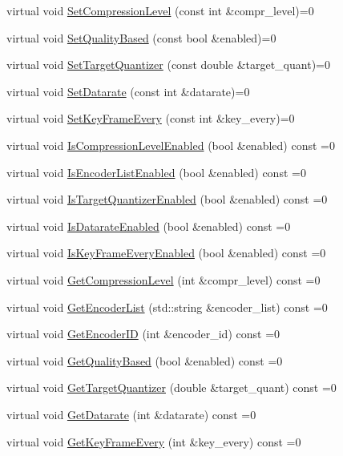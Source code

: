 \begin{DoxyCompactItemize}
\item 
virtual void \hyperlink{classsvl_video_codec_base_ab99462517e534e67543afffb9a480d48}{Set\-Compression\-Level} (const int \&compr\-\_\-level)=0
\item 
virtual void \hyperlink{classsvl_video_codec_base_a5f5d5e0cecb6ccc0476881ad7670c0c1}{Set\-Quality\-Based} (const bool \&enabled)=0
\item 
virtual void \hyperlink{classsvl_video_codec_base_a2dac9b04bd4419461cd38daa8b79a3f8}{Set\-Target\-Quantizer} (const double \&target\-\_\-quant)=0
\item 
virtual void \hyperlink{classsvl_video_codec_base_a3d9f11e00f6cbf4c52c48a78eee46447}{Set\-Datarate} (const int \&datarate)=0
\item 
virtual void \hyperlink{classsvl_video_codec_base_af04b2bd0d9f2b50347594721ee5a422b}{Set\-Key\-Frame\-Every} (const int \&key\-\_\-every)=0
\item 
virtual void \hyperlink{classsvl_video_codec_base_a93fb132b4fa598b9a7d3907b9efc2c73}{Is\-Compression\-Level\-Enabled} (bool \&enabled) const =0
\item 
virtual void \hyperlink{classsvl_video_codec_base_a771977764177e399e89b14f56415da6f}{Is\-Encoder\-List\-Enabled} (bool \&enabled) const =0
\item 
virtual void \hyperlink{classsvl_video_codec_base_a36919a662a2287bbc2855d0c0240a606}{Is\-Target\-Quantizer\-Enabled} (bool \&enabled) const =0
\item 
virtual void \hyperlink{classsvl_video_codec_base_a53d56c6b38a7341e83569de442ade7ad}{Is\-Datarate\-Enabled} (bool \&enabled) const =0
\item 
virtual void \hyperlink{classsvl_video_codec_base_a5c0479c4e6d0bc413b7a0a55ec85caa9}{Is\-Key\-Frame\-Every\-Enabled} (bool \&enabled) const =0
\item 
virtual void \hyperlink{classsvl_video_codec_base_ad4c5251087b9025915eb8de426a6f485}{Get\-Compression\-Level} (int \&compr\-\_\-level) const =0
\item 
virtual void \hyperlink{classsvl_video_codec_base_a359299dd727f4db9efebfa3b4ef95ca4}{Get\-Encoder\-List} (std\-::string \&encoder\-\_\-list) const =0
\item 
virtual void \hyperlink{classsvl_video_codec_base_aa7ce7adc80d611e6ee578d29fd0d4f3f}{Get\-Encoder\-I\-D} (int \&encoder\-\_\-id) const =0
\item 
virtual void \hyperlink{classsvl_video_codec_base_a7b6e98c1f2c0a19fd985de9ee2e28467}{Get\-Quality\-Based} (bool \&enabled) const =0
\item 
virtual void \hyperlink{classsvl_video_codec_base_a7707749fdc3d035b8e203f971694940e}{Get\-Target\-Quantizer} (double \&target\-\_\-quant) const =0
\item 
virtual void \hyperlink{classsvl_video_codec_base_a1034d3bb8ea93ac797a1539e79e5a0b7}{Get\-Datarate} (int \&datarate) const =0
\item 
virtual void \hyperlink{classsvl_video_codec_base_adfe0dd7da14804c042fc5b080ba186f0}{Get\-Key\-Frame\-Every} (int \&key\-\_\-every) const =0
\end{DoxyCompactItemize}
